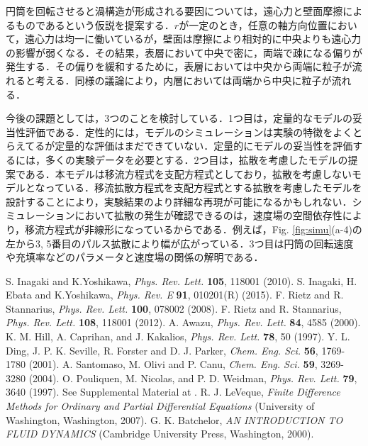 \documentclass[prl,twocolumn,superscriptaddress]{revtex4}
\begin{document}
円筒を回転させると渦構造が形成される要因については，遠心力と壁面摩擦によるものであるという仮説を提案する．$r$が一定のとき，任意の軸方向位置において，遠心力は均一に働いているが，壁面は摩擦により相対的に中央よりも遠心力の影響が弱くなる．その結果，表層において中央で密に，両端で疎になる偏りが発生する．その偏りを緩和するために，表層においては中央から両端に粒子が流れると考える．同様の議論により，内層においては両端から中央に粒子が流れる．

今後の課題としては，3つのことを検討している．1つ目は，定量的なモデルの妥当性評価である．定性的には，モデルのシミュレーションは実験の特徴をよくとらえてるが定量的な評価はまだできていない．定量的にモデルの妥当性を評価するには，多くの実験データを必要とする．2つ目は，拡散を考慮したモデルの提案である．本モデルは移流方程式を支配方程式としており，拡散を考慮しないモデルとなっている．移流拡散方程式を支配方程式とする拡散を考慮したモデルを設計することにより，実験結果のより詳細な再現が可能になるかもしれない．シミュレーションにおいて拡散の発生が確認できるのは，速度場の空間依存性により，移流方程式が非線形になっているからである．例えば，Fig. \ref{fig:simu}(a-4)の左から3, 5番目のパルス拡散により幅が広がっている．3つ目は円筒の回転速度や充填率などのパラメータと速度場の関係の解明である．\\

\begin{thebibliography}{}
S. Inagaki and K.Yoshikawa, {\it{Phys. Rev. Lett.}} {\bf 105}, 118001 (2010).
S. Inagaki, H. Ebata and K.Yoshikawa, {\it{Phys. Rev. E}} {\bf 91}, 010201(R) (2015).
F. Rietz and R. Stannarius, {\it{Phys. Rev. Lett.}} {\bf 100}, 078002 (2008).
F. Rietz and R. Stannarius, {\it{Phys. Rev. Lett.}} {\bf 108}, 118001 (2012).
A. Awazu, {\it{Phys. Rev. Lett.}} {\bf 84}, 4585 (2000).
K. M. Hill, A. Caprihan, and J. Kakalios, {\it{Phys. Rev. Lett.}} {\bf 78}, 50 (1997).
Y. L. Ding, J. P. K. Seville, R. Forster and D. J. Parker, {\it{Chem. Eng. Sci.}} {\bf 56}, 1769-1780 (2001).
A. Santomaso, M. Olivi and P. Canu, {\it{Chem. Eng. Sci.}} {\bf 59}, 3269-3280 (2004).
O. Pouliquen, M. Nicolas, and P. D. Weidman, {\it{Phys. Rev. Lett.}} {\bf 79}, 3640 (1997).
See Supplemental Material at .
R. J. LeVeque, {\it{Finite Difference Methods for Ordinary and Partial Differential Equations}} (University of Washington, Washington, 2007).
G. K. Batchelor, {\it{AN INTRODUCTION TO FLUID DYNAMICS}} (Cambridge University Press, Washington, 2000).
\end{thebibliography}
\end{document}

